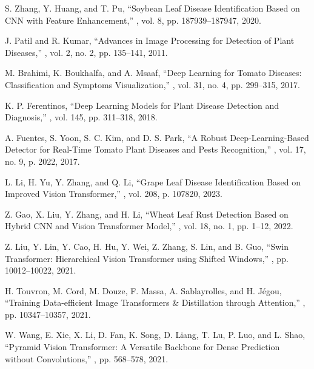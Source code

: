 \documentclass[preprint,12pt]{elsarticle}
\begin{document}
\begin{thebibliography}{99}
S. Zhang, Y. Huang, and T. Pu,
\newblock ``Soybean Leaf Disease Identification Based on CNN with Feature Enhancement,''
, vol. 8, pp. 187939–187947, 2020.

J. Patil and R. Kumar,
\newblock ``Advances in Image Processing for Detection of Plant Diseases,''
, vol. 2, no. 2, pp. 135--141, 2011.

M. Brahimi, K. Boukhalfa, and A. Msaaf,
\newblock ``Deep Learning for Tomato Diseases: Classification and Symptoms Visualization,''
, vol. 31, no. 4, pp. 299--315, 2017.

K. P. Ferentinos,
\newblock ``Deep Learning Models for Plant Disease Detection and Diagnosis,''
, vol. 145, pp. 311--318, 2018.

A. Fuentes, S. Yoon, S. C. Kim, and D. S. Park,
\newblock ``A Robust Deep-Learning-Based Detector for Real-Time Tomato Plant Diseases and Pests Recognition,''
, vol. 17, no. 9, p. 2022, 2017.

L. Li, H. Yu, Y. Zhang, and Q. Li,
\newblock ``Grape Leaf Disease Identification Based on Improved Vision Transformer,''
, vol. 208, p. 107820, 2023.

Z. Gao, X. Liu, Y. Zhang, and H. Li,
\newblock ``Wheat Leaf Rust Detection Based on Hybrid CNN and Vision Transformer Model,''
, vol. 18, no. 1, pp. 1--12, 2022.

Z. Liu, Y. Lin, Y. Cao, H. Hu, Y. Wei, Z. Zhang, S. Lin, and B. Guo,
\newblock ``Swin Transformer: Hierarchical Vision Transformer using Shifted Windows,''
, pp. 10012--10022, 2021.

H. Touvron, M. Cord, M. Douze, F. Massa, A. Sablayrolles, and H. Jégou,
\newblock ``Training Data-efficient Image Transformers & Distillation through Attention,''
, pp. 10347--10357, 2021.

W. Wang, E. Xie, X. Li, D. Fan, K. Song, D. Liang, T. Lu, P. Luo, and L. Shao,
\newblock ``Pyramid Vision Transformer: A Versatile Backbone for Dense Prediction without Convolutions,''
, pp. 568--578, 2021.

\end{thebibliography}
\end{document}
